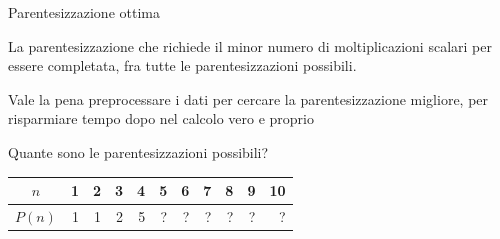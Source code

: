 \begin{frame}{Parentesizzazione ottima}

\vspace{-6pt}
\begin{myboxtitle}
La parentesizzazione che richiede il minor numero di moltiplicazioni scalari per essere completata, fra tutte le parentesizzazioni possibili.
\end{myboxtitle}

\begin{myboxtitle}[Motivazione]
Vale la pena preprocessare i dati per cercare la parentesizzazione migliore, per risparmiare tempo dopo nel calcolo vero e proprio
\end{myboxtitle}

\begin{myboxtitle}[Domanda]
Quante sono le parentesizzazioni possibili?
\begin{center}
\begin{tabular}{|c|r|r|r|r|r|r|r|r|r|r|}
\hline
$n$ & \phantom{0}1 & \phantom{0}2 & \phantom{0}3 & \phantom{0}4 & \phantom{0}5 & \phantom{0}6 & \phantom{0}7 & \phantom{0}8 & \phantom{0}9 & \phantom{0}10 \\\hline
$P(n)$ & 1 & 1 & 2 & 5 & ? & ? & ? & ? & ? & ? \\\hline
\end{tabular}
\end{center}
\end{myboxtitle}
\end{frame}

